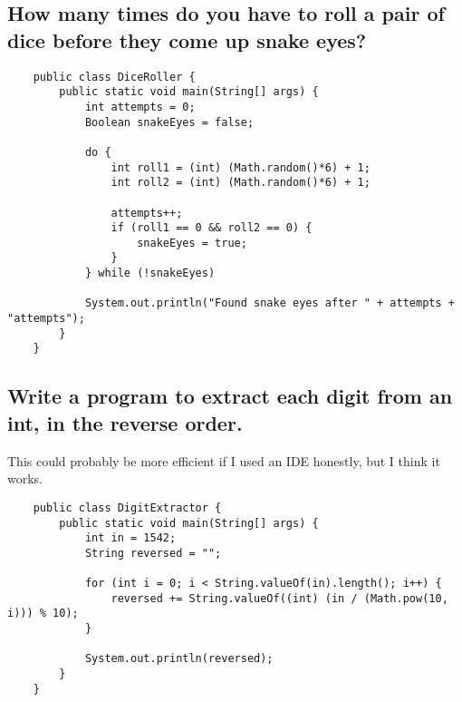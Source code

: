 \documentclass{article}
\begin{document}
    \subsection{How many times do you have to roll a pair of dice before they come up snake eyes?}

    \begin{verbatim}
    public class DiceRoller {
        public static void main(String[] args) {
            int attempts = 0;
            Boolean snakeEyes = false;

            do {
                int roll1 = (int) (Math.random()*6) + 1;
                int roll2 = (int) (Math.random()*6) + 1;

                attempts++;
                if (roll1 == 0 && roll2 == 0) {
                    snakeEyes = true;
                }
            } while (!snakeEyes)
            
            System.out.println("Found snake eyes after " + attempts + "attempts");
        }
    }
    \end{verbatim}

    \subsection{Write a program to extract each digit from an int, in the reverse order.}
    This could probably be more efficient if I used an IDE honestly, but I think it works.

    \begin{verbatim}
    public class DigitExtractor {
        public static void main(String[] args) {
            int in = 1542;
            String reversed = "";

            for (int i = 0; i < String.valueOf(in).length(); i++) {
                reversed += String.valueOf((int) (in / (Math.pow(10, i))) % 10);
            }
            
            System.out.println(reversed);
        }
    }
    \end{verbatim}
\end{document}
